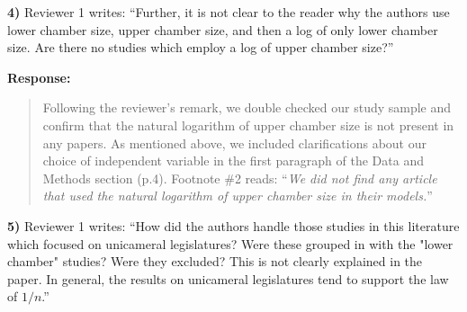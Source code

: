 \documentclass[a4paper,12pt]{article}
\begin{document}
\vspace{.3cm}

\noindent \textbf{4)} Reviewer 1 writes: ``Further, it is not clear to the reader why the authors use lower chamber size, upper chamber size, and then a log of only lower chamber size. Are there no studies which employ a log of upper chamber size?''

\vspace{.3cm}

\noindent \textbf{Response:} 
\begin{quote}
    Following the reviewer's remark, we double checked our study sample and confirm that the natural logarithm of upper chamber size is not present in any papers. As mentioned above, we included clarifications about our choice of independent variable in the first paragraph of the Data and Methods section (p.4). Footnote \#2 reads: ``\textit{We did not find any article that used the natural logarithm of upper chamber size in their models.}''
\end{quote}

\vspace{.3cm}

\noindent \textbf{5)} Reviewer 1 writes: ``How did the authors handle those studies in this literature which focused on unicameral legislatures? Were these grouped in with the "lower chamber" studies? Were they excluded? This is not clearly explained in the paper. In general, the results on unicameral legislatures tend to support the law of $1/n$.''

\vspace{.3cm}
\end{document}
